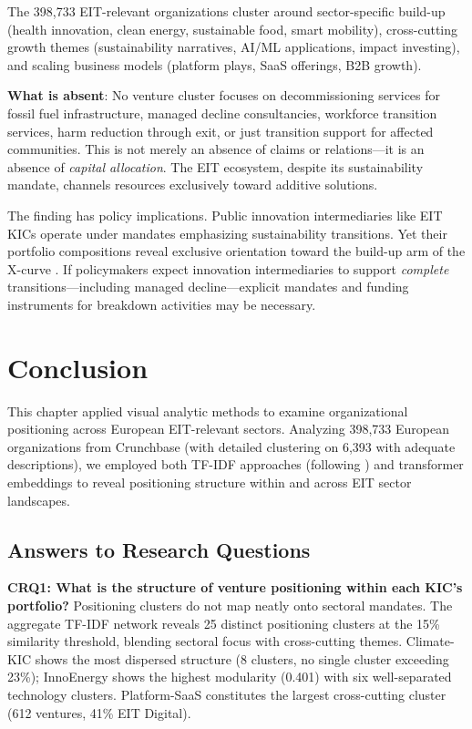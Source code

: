 \documentclass[../main.tex]{subfiles}
\begin{document}
The 398,733 EIT-relevant organizations cluster around sector-specific build-up (health innovation, clean energy, sustainable food, smart mobility), cross-cutting growth themes (sustainability narratives, AI/ML applications, impact investing), and scaling business models (platform plays, SaaS offerings, B2B growth).

\textbf{What is absent}: No venture cluster focuses on decommissioning services for fossil fuel infrastructure, managed decline consultancies, workforce transition services, harm reduction through exit, or just transition support for affected communities. This is not merely an absence of claims or relations---it is an absence of \emph{capital allocation}. The EIT ecosystem, despite its sustainability mandate, channels resources exclusively toward additive solutions.

The finding has policy implications. Public innovation intermediaries like EIT KICs operate under mandates emphasizing sustainability transitions. Yet their portfolio compositions reveal exclusive orientation toward the build-up arm of the X-curve \parencite{hebinck2022xcurve}. If policymakers expect innovation intermediaries to support \emph{complete} transitions---including managed decline---explicit mandates and funding instruments for breakdown activities may be necessary.

\section{Conclusion}

This chapter applied visual analytic methods to examine organizational positioning across European EIT-relevant sectors. Analyzing 398,733 European organizations from Crunchbase (with detailed clustering on 6,393 with adequate descriptions), we employed both TF-IDF approaches (following \cite{basole2019visual}) and transformer embeddings to reveal positioning structure within and across EIT sector landscapes.

\subsection{Answers to Research Questions}

\textbf{CRQ1: What is the structure of venture positioning within each KIC's portfolio?} Positioning clusters do not map neatly onto sectoral mandates. The aggregate TF-IDF network reveals 25 distinct positioning clusters at the 15\% similarity threshold, blending sectoral focus with cross-cutting themes. Climate-KIC shows the most dispersed structure (8 clusters, no single cluster exceeding 23\%); InnoEnergy shows the highest modularity (0.401) with six well-separated technology clusters. Platform-SaaS constitutes the largest cross-cutting cluster (612 ventures, 41\% EIT Digital).
\end{document}
